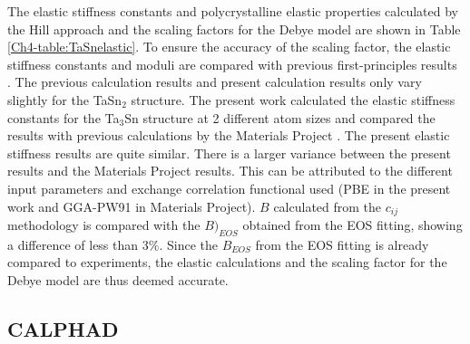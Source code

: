 The elastic stiffness constants and polycrystalline elastic properties calculated by the Hill approach and the scaling factors for the Debye model are shown in Table \ref{Ch4-table:TaSnelastic}. To ensure the accuracy of the scaling factor, the elastic stiffness constants and moduli are compared with previous first-principles results \cite{Jouault1967_611,Bergerhoff1983,Geller1955_165,Karlsruhe,MaterialsProject}. The previous calculation results and present calculation results only vary slightly for the TaSn$_2$ structure. The present work calculated the elastic stiffness constants for the Ta$_3$Sn structure at 2 different atom sizes and compared the results with previous calculations by the Materials Project \cite{Jouault1967_611,Bergerhoff1983,Geller1955_165,Karlsruhe,MaterialsProject}. The present elastic stiffness results are quite similar. There is a larger variance between the present results and the Materials Project results. This can be attributed to the different input parameters and exchange correlation functional used (PBE in the present work and GGA-PW91 in Materials Project). $B$ calculated from the $c_{ij}$ methodology is compared with the $B)_{EOS}$ obtained from the EOS fitting, showing a difference of less than 3$\%$. Since the $B_{EOS}$ from the EOS fitting is already compared to experiments, the elastic calculations and the scaling factor for the Debye model are thus deemed accurate.

\subsection{CALPHAD}

